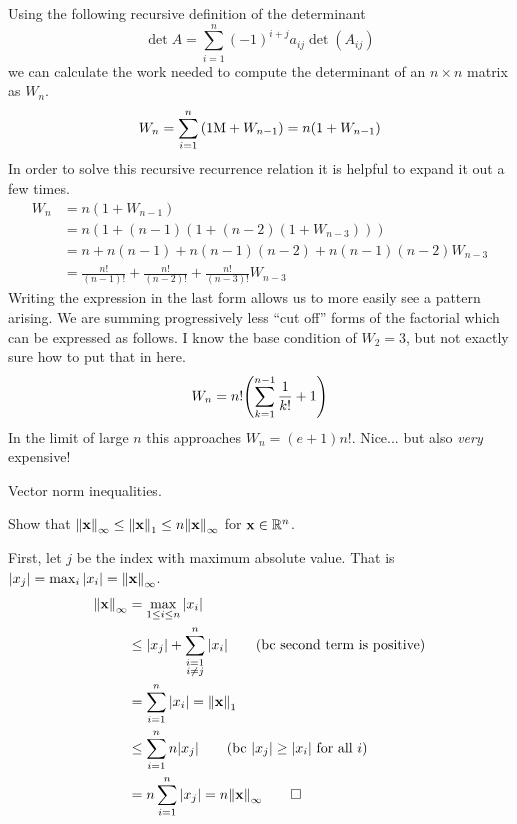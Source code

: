 \documentclass[boxes,pages]{homework}
\begin{document}
\begin{solution}
	Using the following recursive definition of the determinant
	\begin{equation*}
		\det A = \sum_{i = 1}^n (-1)^{i + j}a_{ij}\det(A_{ij})
	\end{equation*}
	we can calculate the work needed to compute the determinant of an $n\times n$ matrix as $W_n$.
	\begin{equation*}
		W_n = \sum_{i = 1}^n\qty(1\mathrm{M} + W_{n - 1}) = n\qty(1 + W_{n - 1})
	\end{equation*}
	In order to solve this recursive recurrence relation it is helpful to expand it out a few times.
	\begin{align*}
		W_n & = n(1 + W_{n - 1})                                                         \\
		    & = n(1 + (n - 1)(1 + (n - 2)(1 + W_{n - 3})))                               \\
		    & = n + n(n - 1) + n(n - 1)(n - 2) + n(n-1)(n - 2)W_{n - 3}                  \\
		    & = \frac{n!}{(n - 1)!} + \frac{n!}{(n - 2)!} + \frac{n!}{(n - 3)!}W_{n - 3}
	\end{align*}
	Writing the expression in the last form allows us to more easily see a pattern arising. We are summing progressively less ``cut off'' forms of the factorial which can be expressed as follows. I know the base condition of $W_2 = 3$, but not exactly sure how to put that in here.
	\begin{equation*}
		W_n = n!\qty(\sum_{k = 1}^{n - 1}\frac{1}{k!} + 1)
	\end{equation*}
	In the limit of large $n$ this approaches $W_n = (e + 1)n!$. Nice... but also \emph{very} expensive!
\end{solution}

\begin{problem}
Vector norm inequalities.

Show that $\norm{\vb{x}}_\infty \leq\norm{\vb{x}}_1 \leq n\norm{\vb{x}}_\infty$ for $\vb{x}\in\mathbb{R}^n$.
\end{problem}

\begin{solution}
	First, let $j$ be the index with maximum absolute value. That is $\abs{x_j} = \max_i \abs{x_i} = \norm{\vb{x}}_\infty$.
	\begin{align*}
		\norm{\vb{x}}_\infty & = \max_{1\leq i\leq n}\abs{x_i}                                                \\
		                     & \leq \abs{x_j} + \sum_{\substack{i = 1                                         \\ i\neq j}}^n\abs{x_i} \tag{bc second term is positive} \\
		                     & = \sum_{i=1}^n \abs{x_i} = \norm{\vb{x}}_1                                     \\
		                     & \leq \sum_{i = 1}^n n\abs{x_j} \tag{bc $\abs{x_j} \geq \abs{x_i}$ for all $i$} \\
		                     & = n\sum_{i = 1}	^n \abs{x_j} = n\norm{\vb{x}}_\infty \tag*{$\square$}
	\end{align*}
\end{solution}
\end{document}
